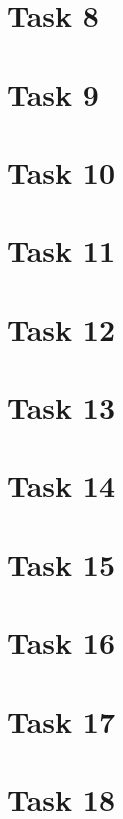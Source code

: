 \documentclass[a4paper,12pt,oneside,onecolumn]{article} %
\begin{document}
\section*{Task 8}


\section*{Task 9}
%

\section*{Task 10}


\section*{Task 11}


\section*{Task 12}


\section*{Task 13}


\section*{Task 14}
%

\section*{Task 15}
%

\section*{Task 16}
%

\section*{Task 17}
%

\section*{Task 18}
%
\end{document}
